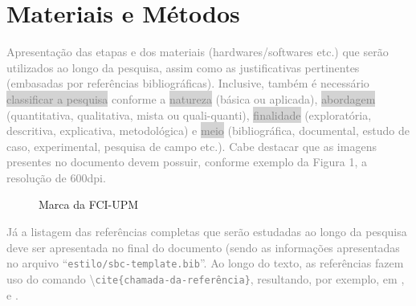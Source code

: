 \section{Materiais e Métodos}
\textcolor{gray}{Apresentação das etapas e dos materiais (hardwares/softwares etc.) que serão utilizados ao longo da pesquisa, assim como as justificativas pertinentes (embasadas por referências bibliográficas). Inclusive, também é necessário \colorbox{lightgray}{classificar a pesquisa} conforme a \colorbox{lightgray}{natureza} (básica ou aplicada), \colorbox{lightgray}{abordagem} (quantitativa, qualitativa, mista ou quali-quanti), \colorbox{lightgray}{finalidade} (exploratória, descritiva, explicativa, metodológica) e \colorbox{lightgray}{meio} (bibliográfica, documental, estudo de caso, experimental, pesquisa de campo etc.).}
\textcolor{gray}{Cabe destacar que as imagens presentes no documento devem possuir, conforme exemplo da Figura 1, a resolução de 600dpi.} 
\begin{figure}[h]
\centering

\caption{Marca da FCI-UPM}
\end{figure}

\textcolor{gray}{Já a listagem das referências completas que serão estudadas ao longo da pesquisa deve ser apresentada no final do documento (sendo as informações apresentadas no arquivo ``\texttt{estilo/sbc-template.bib}''. Ao longo do texto, as referências fazem uso do comando  \textbackslash\texttt{cite\{chamada-da-referência\}}, resultando, por exemplo, em \cite{boulic:91}, \cite{smith:99} e \cite{knuth:84}.}
